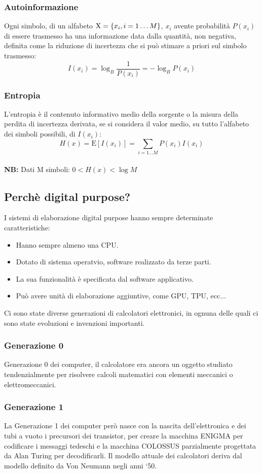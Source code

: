 \documentclass{article}
\begin{document}
\subsubsection{Autoinformazione}
Ogni simbolo, di un alfabeto $ \text{X}=\{x_i,\space i = 1 \dots M\}$, $x_i$ avente probabilità $P(x_i)$ di essere trasmesso ha una informazione data dalla quantità, non negativa, definita come la riduzione di incertezza che si può stimare a priori sul simbolo trasmesso: 
\[I(x_i) = \log_B \frac{1}{P(x_i)}
         = -\log_B P(x_i)\]

\subsubsection{Entropia}
L’entropia è il contenuto informativo medio della sorgente o la misura della perdita di incertezza derivata, se si considera il valor medio, su tutto l’alfabeto dei simboli possibili, di $I(x_i)$:
\[H(x) = \text{E}[I(x_i)] = \sum_{i = 1 \dots M} P(x_i)I(x_i)\]
\\
\textbf{NB:} Dati M simboli: $0 < H(x) < \log M$

\subsection{Perchè digital purpose?}
I sistemi di elaborazione digital purpose hanno sempre determinate caratteristiche: 
\begin{itemize}
    \item Hanno sempre almeno una CPU.
    \item Dotato di sistema operatvio, software realizzato da terze parti.
    \item La sua funzionalità è specificata dal software applicativo.
    \item Può avere unità di elaborazione aggiuntive, come GPU, TPU, ecc...
\end{itemize}
Ci sono state diverse generazioni di calcolatori elettronici, in ognuna delle quali ci sono state evoluzioni e invenzioni importanti.

\subsubsection{Generazione 0}
Generazione 0 dei computer, il calcolatore era ancora un oggetto studiato tendenzialmente per risolvere calcoli matematici con elementi meccanici o elettromeccanici.

\subsubsection{Generazione 1}
La Generazione 1 dei computer però nasce con la nascita dell’elettronica e dei tubi a vuoto i precursori dei transistor, per creare la macchina ENIGMA per codificare i messaggi tedeschi e la macchina COLOSSUS parzialmente progettata da Alan Turing per decodificarli. 
Il modello attuale dei calcolatori deriva dal modello definito da Von Neumann negli anni ‘50.
\end{document}
